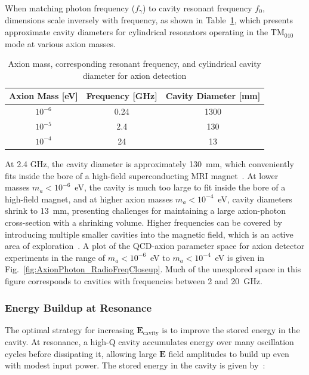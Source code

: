     When matching photon frequency ($f_{\gamma}$) to cavity resonant frequency $f_0$, dimensions scale inversely with frequency, as shown in Table~\ref{tab:axion_cavity_sizes}, which presents approximate cavity diameters for cylindrical resonators operating in the TM$_{010}$ mode at various axion masses.

    \begin{table}[h]
    \centering
    \caption{Axion mass, corresponding resonant frequency, and cylindrical cavity diameter for axion detection}
    \begin{tabular}{ccc}
    \hline
    Axion Mass [eV] & Frequency [GHz] & Cavity Diameter [mm] \\
    \hline
    $10^{-6}$  & 0.24  & 1300  \\
    $10^{-5}$  & 2.4  & 130  \\
    $10^{-4}$  & 24  & 13  \\
    \hline
    \end{tabular}
    \label{tab:axion_cavity_sizes}
    \end{table}

    At 2.4 GHz, the cavity diameter is approximately 130~mm, which conveniently fits inside the bore of a high-field superconducting MRI magnet~\cite{thulbornChallengesIntegrating94T2006}. At lower masses $m_a<10^{-6}$~eV, the cavity is much too large to fit inside the bore of a high-field magnet, and at higher axion masses $m_a<10^{-4}$~eV, cavity diameters shrink to $13$~mm, presenting challenges for maintaining a large axion-photon cross-section with a shrinking volume. Higher frequencies can be covered by introducing multiple smaller cavities into the magnetic field, which is an active area of exploration~\cite{McAllister:2017lkb, knirckADMXExtendedFrequency2023}. A plot of the QCD-axion parameter space for axion detector experiments in the range of $m_a<10^{-6}$~eV to $m_a<10^{-4}$~eV is given in Fig.~\ref{fig:AxionPhoton_RadioFreqCloseup}. Much of the unexplored space in this figure corresponds to cavities with frequencies between 2 and 20~GHz.

    \subsubsection{Energy Buildup at Resonance}

    The optimal strategy for increasing $\mathbf{E}_{\text{cavity}}$ is to improve the stored energy in the cavity. At resonance, a high-Q cavity accumulates energy over many oscillation cycles before dissipating it, allowing large $\textbf{E}$ field amplitudes to build up even with modest input power. The stored energy in the cavity is given by~\cite{padamseeRFSuperconductivity2009}:

